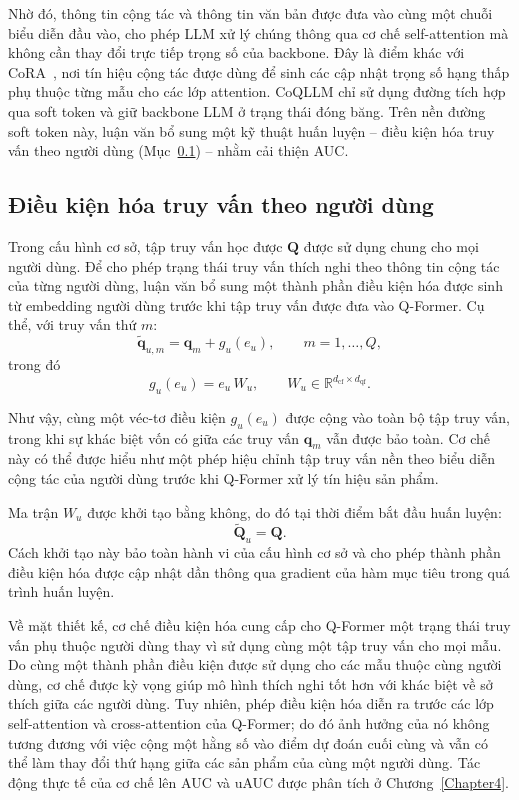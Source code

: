 Nhờ đó, thông tin cộng tác và thông tin văn bản được đưa vào cùng một chuỗi biểu diễn đầu vào,
cho phép LLM xử lý chúng thông qua cơ chế self-attention mà không cần thay đổi trực tiếp trọng số
của backbone. Đây là điểm khác với CoRA~\cite{cora2024}, nơi tín hiệu cộng tác được dùng để sinh
các cập nhật trọng số hạng thấp phụ thuộc từng mẫu cho các lớp attention. CoQLLM chỉ sử dụng
đường tích hợp qua soft token và giữ backbone LLM ở trạng thái đóng băng. Trên nền đường soft
token này, luận văn bổ sung một kỹ thuật huấn luyện -- điều kiện hóa truy vấn theo người dùng
(Mục~\ref{ssec:user-conditioned}) -- nhằm cải thiện AUC.

\subsection{Điều kiện hóa truy vấn theo người dùng}
\label{ssec:user-conditioned}

Trong cấu hình cơ sở, tập truy vấn học được $\mathbf{Q}$ được sử dụng chung cho mọi người dùng.
Để cho phép trạng thái truy vấn thích nghi theo thông tin cộng tác của từng người dùng, luận văn
bổ sung một thành phần điều kiện hóa được sinh từ embedding người dùng trước khi tập truy vấn
được đưa vào Q-Former. Cụ thể, với truy vấn thứ $m$:
\begin{equation} \label{eq:user-cond}
\tilde{\mathbf{q}}_{u,m} = \mathbf{q}_m + g_u(e_u), \qquad m = 1,\dots,Q,
\end{equation}
trong đó
\[
g_u(e_u) = e_u\, W_u, \qquad W_u \in \mathbb{R}^{d_{\text{cf}} \times d_{\text{qf}}}.
\]

Như vậy, cùng một véc-tơ điều kiện $g_u(e_u)$ được cộng vào toàn bộ tập truy vấn, trong khi sự
khác biệt vốn có giữa các truy vấn $\mathbf{q}_m$ vẫn được bảo toàn. Cơ chế này có thể được hiểu
như một phép hiệu chỉnh tập truy vấn nền theo biểu diễn cộng tác của người dùng trước khi
Q-Former xử lý tín hiệu sản phẩm.

Ma trận $W_u$ được khởi tạo bằng không, do đó tại thời điểm bắt đầu huấn luyện:
\[
\widetilde{\mathbf{Q}}_u = \mathbf{Q}.
\]
Cách khởi tạo này bảo toàn hành vi của cấu hình cơ sở và cho phép thành phần điều kiện hóa được
cập nhật dần thông qua gradient của hàm mục tiêu trong quá trình huấn luyện.

Về mặt thiết kế, cơ chế điều kiện hóa cung cấp cho Q-Former một trạng thái truy vấn phụ thuộc
người dùng thay vì sử dụng cùng một tập truy vấn cho mọi mẫu. Do cùng một thành phần điều kiện
được sử dụng cho các mẫu thuộc cùng người dùng, cơ chế được kỳ vọng giúp mô hình thích nghi tốt
hơn với khác biệt về sở thích giữa các người dùng. Tuy nhiên, phép điều kiện hóa diễn ra trước
các lớp self-attention và cross-attention của Q-Former; do đó ảnh hưởng của nó không tương đương
với việc cộng một hằng số vào điểm dự đoán cuối cùng và vẫn có thể làm thay đổi thứ hạng giữa các
sản phẩm của cùng một người dùng. Tác động thực tế của cơ chế lên AUC và uAUC được phân tích ở
Chương~\ref{Chapter4}.

